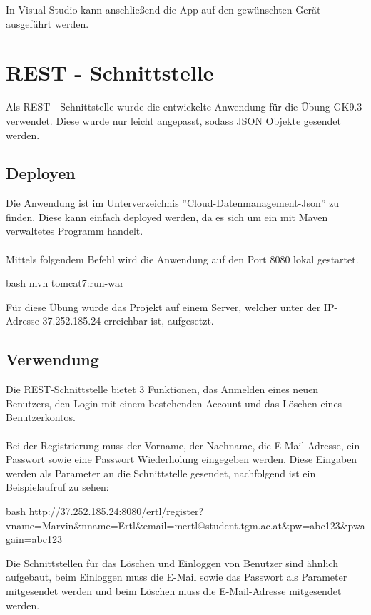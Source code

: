 In Visual Studio kann anschließend die App auf den gewünschten Gerät ausgeführt werden.

\section{REST - Schnittstelle}

Als REST - Schnittstelle wurde die entwickelte Anwendung für die Übung GK9.3 verwendet. Diese wurde nur leicht angepasst, sodass JSON Objekte gesendet werden.

\subsection{Deployen}

Die Anwendung ist im Unterverzeichnis ''Cloud-Datenmanagement-Json'' zu finden. Diese kann einfach deployed werden, da es sich um ein mit Maven verwaltetes Programm handelt.
\\\\
Mittels folgendem Befehl wird die Anwendung auf den Port 8080 lokal gestartet.

\begin{code}{bash}
	mvn tomcat7:run-war
\end{code}

Für diese Übung wurde das Projekt auf einem Server, welcher unter der IP-Adresse 37.252.185.24 erreichbar ist, aufgesetzt.

\subsection{Verwendung}

Die REST-Schnittstelle bietet 3 Funktionen, das Anmelden eines neuen Benutzers, den Login mit einem bestehenden Account und das Löschen eines Benutzerkontos.
\\\\
Bei der Registrierung muss der Vorname, der Nachname, die E-Mail-Adresse, ein Passwort sowie eine Passwort Wiederholung eingegeben werden. Diese Eingaben werden als Parameter an die Schnittstelle gesendet, nachfolgend ist ein Beispielaufruf zu sehen:

\begin{code}{bash}
	http://37.252.185.24:8080/ertl/register?vname=Marvin&nname=Ertl&email=mertl@student.tgm.ac.at&pw=abc123&pwagain=abc123
\end{code}

Die Schnittstellen für das Löschen und Einloggen von Benutzer sind ähnlich aufgebaut, beim Einloggen muss die E-Mail sowie das Passwort als Parameter mitgesendet werden und beim Löschen muss die E-Mail-Adresse mitgesendet werden.

